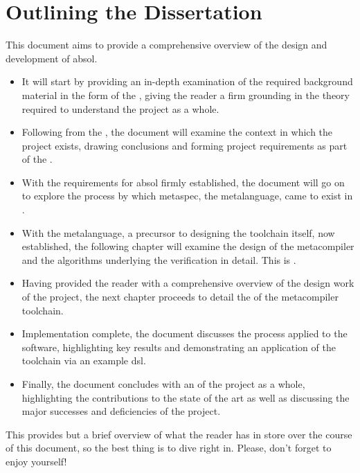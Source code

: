 \section{Outlining the Dissertation} %
\label{sec:outlining_the_dissertation}
This document aims to provide a comprehensive overview of the design and development of \gls{absol}. 
\begin{itemize}
    \item It will start by providing an in-depth examination of the required background material in the form of the , giving the reader a firm grounding in the theory required to understand the project as a whole.
    \item Following from the , the document will examine the context in which the project exists, drawing conclusions and forming project requirements as part of the .
    \item With the requirements for \gls{absol} firmly established, the document will go on to explore the process by which \gls{metaspec}, the metalanguage, came to exist in .
    \item With the metalanguage, a precursor to designing the toolchain itself, now established, the following chapter will examine the design of the metacompiler and the algorithms underlying the verification in detail.
    This is .
    \item Having provided the reader with a comprehensive overview of the design work of the project, the next chapter proceeds to detail the  of the metacompiler toolchain.
    \item Implementation complete, the document discusses the  process applied to the software, highlighting key results and demonstrating an application of the toolchain via an example \gls{dsl}.
    \item Finally, the document concludes with an  of the project as a whole, highlighting the contributions to the state of the art as well as discussing the major successes and deficiencies of the project.
\end{itemize}

This provides but a brief overview of what the reader has in store over the course of this document, so the best thing is to dive right in.
Please, don't forget to enjoy yourself!


